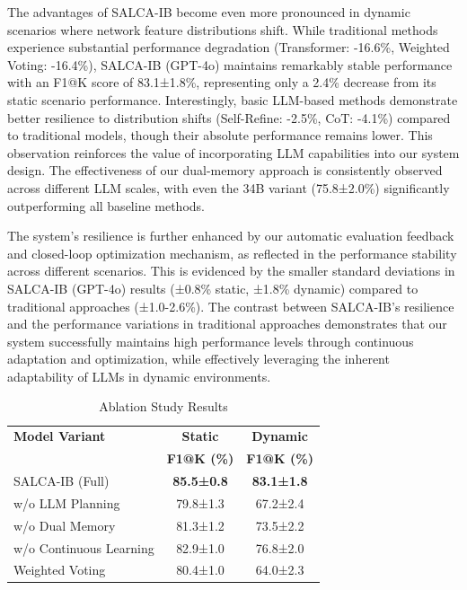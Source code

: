\documentclass[conference]{IEEEtran}
\begin{document}
The advantages of SALCA-IB become even more pronounced in dynamic scenarios where network feature distributions shift. While traditional methods experience substantial performance degradation (Transformer: -16.6\%, Weighted Voting: -16.4\%), SALCA-IB (GPT-4o) maintains remarkably stable performance with an F1@K score of 83.1±1.8\%, representing only a 2.4\% decrease from its static scenario performance. Interestingly, basic LLM-based methods demonstrate better resilience to distribution shifts (Self-Refine: -2.5\%, CoT: -4.1\%) compared to traditional models, though their absolute performance remains lower. This observation reinforces the value of incorporating LLM capabilities into our system design. The effectiveness of our dual-memory approach is consistently observed across different LLM scales, with even the 34B variant (75.8±2.0\%) significantly outperforming all baseline methods.

The system's resilience is further enhanced by our automatic evaluation feedback and closed-loop optimization mechanism, as reflected in the performance stability across different scenarios. This is evidenced by the smaller standard deviations in SALCA-IB (GPT-4o) results (±0.8\% static, ±1.8\% dynamic) compared to traditional approaches (±1.0-2.6\%). The contrast between SALCA-IB's resilience and the performance variations in traditional approaches demonstrates that our system successfully maintains high performance levels through continuous adaptation and optimization, while effectively leveraging the inherent adaptability of LLMs in dynamic environments.

\begin{table}[!t]
\caption{Ablation Study Results}
\label{tab:ablation}
\renewcommand{\arraystretch}{1.2}
\begin{center}
\begin{tabular}{l|cc}
\hline\hline
\textbf{Model Variant} & \textbf{Static} & \textbf{Dynamic} \\
& \textbf{F1@K (\%)} & \textbf{F1@K (\%)} \\
\hline
SALCA-IB (Full) & \textbf{85.5±0.8} & \textbf{83.1±1.8} \\
\hline
w/o LLM Planning & 79.8±1.3 & 67.2±2.4 \\
w/o Dual Memory & 81.3±1.2 & 73.5±2.2 \\
w/o Continuous Learning & 82.9±1.0 & 76.8±2.0 \\
\hline
Weighted Voting & 80.4±1.0 & 64.0±2.3 \\
\hline\hline
\end{tabular}
\end{center}
\end{table}
\end{document}
